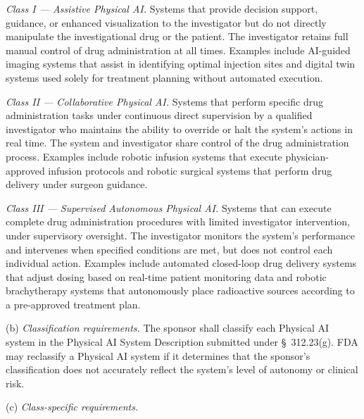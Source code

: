 \begin{description}[leftmargin=0.8cm,style=sameline]
\item[(1)] \textit{Class I --- Assistive Physical AI.} Systems that provide decision support, guidance, or enhanced visualization to the investigator but do not directly manipulate the investigational drug or the patient. The investigator retains full manual control of drug administration at all times. Examples include AI-guided imaging systems that assist in identifying optimal injection sites and digital twin systems used solely for treatment planning without automated execution.
\item[(2)] \textit{Class II --- Collaborative Physical AI.} Systems that perform specific drug administration tasks under continuous direct supervision by a qualified investigator who maintains the ability to override or halt the system's actions in real time. The system and investigator share control of the drug administration process. Examples include robotic infusion systems that execute physician-approved infusion protocols and robotic surgical systems that perform drug delivery under surgeon guidance.
\item[(3)] \textit{Class III --- Supervised Autonomous Physical AI.} Systems that can execute complete drug administration procedures with limited investigator intervention, under supervisory oversight. The investigator monitors the system's performance and intervenes when specified conditions are met, but does not control each individual action. Examples include automated closed-loop drug delivery systems that adjust dosing based on real-time patient monitoring data and robotic brachytherapy systems that autonomously place radioactive sources according to a pre-approved treatment plan.
\end{description}

(b) \textit{Classification requirements.} The sponsor shall classify each Physical AI system in the Physical AI System Description submitted under \S~312.23(g). FDA may reclassify a Physical AI system if it determines that the sponsor's classification does not accurately reflect the system's level of autonomy or clinical risk.

(c) \textit{Class-specific requirements.}

